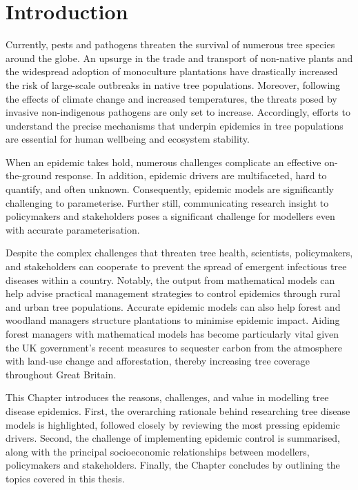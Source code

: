 \chapter{Introduction}

Currently, pests and pathogens threaten the survival of numerous tree species around the globe. 
An upsurge in the trade and transport of non-native plants and the widespread adoption of monoculture plantations have drastically increased the risk of large-scale outbreaks in native tree populations.
Moreover, following the effects of climate change and increased temperatures, the threats posed by invasive non-indigenous pathogens are only set to increase. Accordingly, efforts to understand the precise mechanisms that underpin epidemics in tree populations are essential for human wellbeing and ecosystem stability.

When an epidemic takes hold, numerous challenges complicate an effective on-the-ground response. In addition, epidemic drivers are multifaceted, hard to quantify, and often unknown. 
Consequently, epidemic models are significantly challenging to parameterise. 
Further still, communicating research insight to policymakers and stakeholders poses a significant challenge for modellers even with accurate parameterisation.

Despite the complex challenges that threaten tree health, scientists, policymakers, and stakeholders can cooperate to prevent the spread of emergent infectious tree diseases within a country.
Notably, the output from mathematical models can help advise practical management strategies to control epidemics through rural and urban tree populations.
Accurate epidemic models can also help forest and woodland managers structure plantations to minimise epidemic impact. 
Aiding forest managers with mathematical models has become particularly vital given the UK government's recent measures to sequester carbon from the atmosphere with land-use change and afforestation, thereby increasing tree coverage throughout Great Britain.

This Chapter introduces the reasons, challenges, and value in modelling tree disease epidemics.
First, the overarching rationale behind researching tree disease models is highlighted, followed closely by reviewing the most pressing epidemic drivers.
Second, the challenge of implementing epidemic control is summarised, along with the principal socioeconomic relationships between modellers, policymakers and stakeholders. Finally, the Chapter concludes by outlining the topics covered in this thesis.


